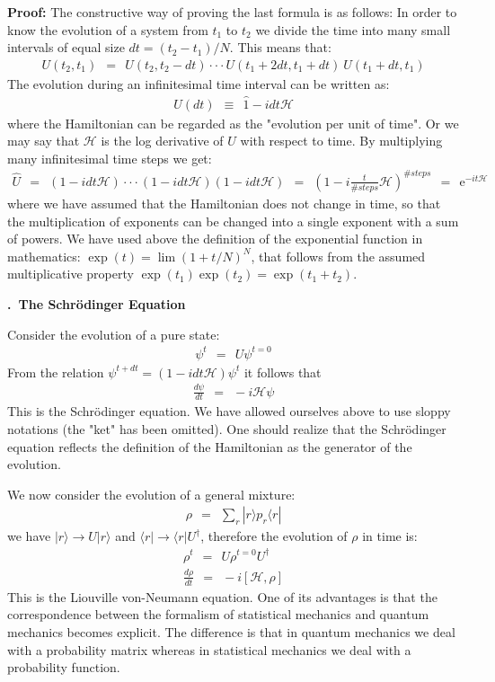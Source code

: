 \documentclass[onecolumn,fleqn, 11pt]{revtex4}
\newcommand{\eexp}{\mathrm{e}^}
\newcommand{\beq}{\begin{eqnarray}}
\newcommand{\eeq}{\end{eqnarray}}
\renewcommand{\thesubsection}{\arabic{subsection}}
\renewcommand{\thesubsubsection}{\arabic{subsubsection}}
\newcommand{\sheadC}[1]
{
\addtocounter{subsubsection}{1}
\vspace{5mm}
{\bf \thesubsection.\thesubsubsection \ #1}  
\nopagebreak
\phantomsection
}
\begin{document}
 
{\bf Proof:} 
The constructive way of proving the last formula is as follows:
In order to know the evolution of a system from ${t_1}$ to ${t_2}$ 
we divide the time into many small intervals 
of equal size ${dt = (t_2-t_1)/N}$. This means that:
\beq
U(t_2,t_1) \ \ = \ \ U(t_2,t_2{-}dt) \cdot\cdot\cdot  U(t_1{+}2dt,t_1+dt) \ U(t_1{+}dt,t_1)
\eeq
The evolution during an infinitesimal time interval can be written as:
\beq
U(dt) \ \ \equiv \ \ \hat{1} - i dt \mathcal{H} 
\eeq
where the Hamiltonian can be regarded as the "evolution per unit of time". 
Or we may say that $\mathcal{H}$ is the log derivative of $U$ with respect 
to time. By multiplying many infinitesimal time steps we get:
\beq
\hat{U} \ \ =  \ \ (1-i dt\mathcal{H})\cdot \cdot \cdot (1-i dt\mathcal{H}) (1-idt\mathcal{H})
\ \ = \ \ 
\left(1-i \frac{t}{\#steps}\mathcal{H}\right)^{\#steps} 
\ \ = \ \ \eexp{-it\mathcal{H}} 
\eeq
where we have assumed that the Hamiltonian does not 
change in time, so that the multiplication of exponents 
can be changed into a single exponent with a sum of powers. 
We have used above the definition of the 
exponential function in mathematics: ${\exp(t) = \lim (1+t/N)^N}$, 
that follows from the assumed 
multiplicative property ${\exp(t_1)\exp(t_2)=\exp(t_1+t_2)}$. 


 
\sheadC{The Schr\"{o}dinger Equation}


Consider the evolution of a pure state:
\beq
\psi^{t} \ \ = \ \ U \psi^{t{=}0} 
\eeq
From the relation ${\psi^{t+dt} =(1-idt\mathcal{H})\psi^{t}}$ it follows that  
\beq 
\frac{d\psi}{dt} \ \ = \ \ -i\mathcal{H}\psi
\eeq
This is the Schr\"{o}dinger equation.
We have allowed ourselves above to use 
sloppy notations (the "ket" has been omitted). 
One should realize that the Schr\"{o}dinger equation
reflects the definition of the Hamiltonian 
as the generator of the evolution.
 
We now consider the evolution of a general mixture:
\beq
\rho \ \ = \ \ \sum_r |r\rangle p_r \langle r|
\eeq
we have $|r\rangle \rightarrow U|r\rangle$ and $\langle r| \rightarrow \langle r|U^\dagger$, 
therefore the evolution of $\rho$ in time is:
\beq
\rho^t \ \ = \ \ U \rho^{t{=}0}U^{\dagger} 
\\ 
\frac{d\rho}{dt} \ \ = \ \ -i[\mathcal{H}, \rho]
\eeq
This is the Liouville von-Neumann equation. 
One of its advantages is that the correspondence 
between the formalism of statistical mechanics  
and quantum mechanics becomes explicit. 
The difference is that in quantum mechanics we deal 
with a probability matrix whereas in statistical mechanics 
we deal with a probability function. 
\end{document}
